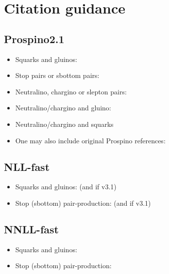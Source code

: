 \documentclass{article}
\begin{document}
\section*{Citation guidance}


\subsection*{Prospino2.1}
\begin{itemize}
 \item Squarks and gluinos:
       \cite{ProspinoWeb,Beenakker:1996ch}
 \item Stop pairs or sbottom pairs:
       \cite{ProspinoWeb,Beenakker:1997ut}
 \item Neutralino, chargino or slepton pairs:
       \cite{ProspinoWeb,Beenakker:1999xh}
 \item Neutralino/chargino and gluino:
       \cite{ProspinoWeb,Spira:2002rd,Plehn:2004rp}
 \item Neutralino/chargino and squarks
       \cite{ProspinoWeb,Plehn:2004rp}
 \item One may also include original Prospino references:
       \cite{Beenakker:1996ed,Beenakker:1994an,Beenakker:1995fp,Beenakker:1996ch}
\end{itemize}

\subsection*{NLL-fast}
\begin{itemize}
 \item Squarks and gluinos:
       \cite{NLLfastWeb,Beenakker:1996ch,Kulesza:2008jb,Kulesza:2009kq,Beenakker:2009ha,Beenakker:2011fu} (and \cite{Beenakker:2015rna} if v3.1)
 \item Stop (sbottom) pair-production:
       \cite{NLLfastWeb,Beenakker:1997ut,Beenakker:2010nq,Beenakker:2011fu} (and \cite{Beenakker:2015rna} if v3.1)
\end{itemize}

\subsection*{NNLL-fast}
\begin{itemize}
 \item Squarks and gluinos:\cite{NNLLfastWeb,Beenakker:2016lwe,Beenakker:1996ch,Kulesza:2008jb,Kulesza:2009kq,Beenakker:2009ha,Beenakker:2011sf,Beenakker:2013mva,Beenakker:2014sma}
 \item Stop (sbottom) pair-production: \cite{NNLLfastWeb,Beenakker:2016lwe,Beenakker:1997ut,Beenakker:2010nq,Beenakker:2016gmf}
\end{itemize}

{\footnotesize }
\end{document}
